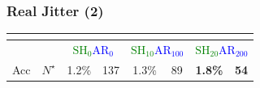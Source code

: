 \begin{frame}
\frametitle{Real Jitter (2)}
\centering
\begin{scriptsize}
\begin{table}
\begin{tabular}{|c|c|c|c|c|c|c|c|}
\multicolumn{8}{c}{}\\
\hline
\multicolumn{2}{|c|}{} & \multicolumn{2}{c|}{\textcolor{green}{$\mathrm{SH}_{0}$}\textcolor{blue}{$\mathrm{AR}_{0}$}} & \multicolumn{2}{c|}{\textcolor{green}{$\mathrm{SH}_{10}$}\textcolor{blue}{$\mathrm{AR}_{100}$}} & \multicolumn{2}{c|}{\textcolor{green}{$\mathrm{SH}_{20}$}\textcolor{blue}{$\mathrm{AR}_{200}$}} \\ \hline
Acc        & $N^\star$       & 1.2\%                      & 137                      & 1.3\%                       & 89                         & \textbf{1.8\%}              & \textbf{54}                \\ \hline
\end{tabular}
\end{table}
\end{scriptsize}
\vspace*{-18pt}

\centering
{}


\end{frame}

